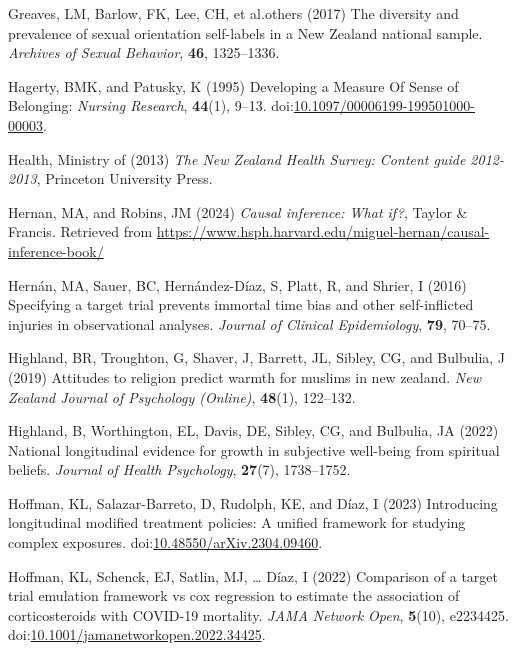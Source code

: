 \documentclass[
  single column]{article}
\newlength{\cslhangindent}
\newenvironment{CSLReferences}[2] %
 {\begin{list}{}{%
  \setlength{\itemindent}{0pt}
  \setlength{\leftmargin}{0pt}
  \setlength{\parsep}{0pt}
  \ifodd #1
   \setlength{\leftmargin}{\cslhangindent}
   \setlength{\itemindent}{-1\cslhangindent}
  \fi
  \setlength{\itemsep}{#2\baselineskip}}}
 {\end{list}}
\begin{document}
\begin{CSLReferences}{1}{0}
Greaves, LM, Barlow, FK, Lee, CH, et al.others (2017) The diversity and
prevalence of sexual orientation self-labels in a {N}ew {Z}ealand
national sample. \emph{Archives of Sexual Behavior}, \textbf{46},
1325--1336.

Hagerty, BMK, and Patusky, K (1995) Developing a Measure Of Sense of
Belonging: \emph{Nursing Research}, \textbf{44}(1), 9--13.
doi:\href{https://doi.org/10.1097/00006199-199501000-00003}{10.1097/00006199-199501000-00003}.

Health, Ministry of (2013) \emph{The {N}ew {Z}ealand {H}ealth {S}urvey:
Content guide 2012-2013}, Princeton University Press.

Hernan, MA, and Robins, JM (2024) \emph{Causal inference: What if?},
Taylor \& Francis. Retrieved from
\url{https://www.hsph.harvard.edu/miguel-hernan/causal-inference-book/}

Hernán, MA, Sauer, BC, Hernández-Díaz, S, Platt, R, and Shrier, I (2016)
Specifying a target trial prevents immortal time bias and other
self-inflicted injuries in observational analyses. \emph{Journal of
Clinical Epidemiology}, \textbf{79}, 70--75.

Highland, BR, Troughton, G, Shaver, J, Barrett, JL, Sibley, CG, and
Bulbulia, J (2019) Attitudes to religion predict warmth for muslims in
new zealand. \emph{New Zealand Journal of Psychology (Online)},
\textbf{48}(1), 122--132.

Highland, B, Worthington, EL, Davis, DE, Sibley, CG, and Bulbulia, JA
(2022) National longitudinal evidence for growth in subjective
well-being from spiritual beliefs. \emph{Journal of Health Psychology},
\textbf{27}(7), 1738--1752.

Hoffman, KL, Salazar-Barreto, D, Rudolph, KE, and Díaz, I (2023)
Introducing longitudinal modified treatment policies: A unified
framework for studying complex exposures.
doi:\href{https://doi.org/10.48550/arXiv.2304.09460}{10.48550/arXiv.2304.09460}.

Hoffman, KL, Schenck, EJ, Satlin, MJ, \ldots{} Díaz, I (2022) Comparison
of a target trial emulation framework vs cox regression to estimate the
association of corticosteroids with COVID-19 mortality. \emph{JAMA
Network Open}, \textbf{5}(10), e2234425.
doi:\href{https://doi.org/10.1001/jamanetworkopen.2022.34425}{10.1001/jamanetworkopen.2022.34425}.


\end{CSLReferences}
\end{document}
